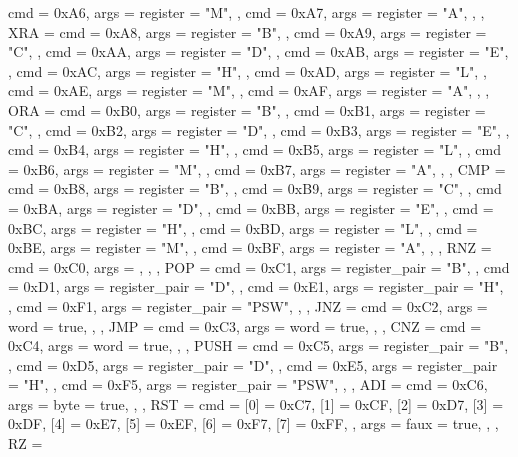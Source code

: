 {{        { cmd = 0xA6, args = {{register = "M"}}, },
        { cmd = 0xA7, args = {{register = "A"}}, },
    },
    XRA  = {
        { cmd = 0xA8, args = {{register = "B"}}, },
        { cmd = 0xA9, args = {{register = "C"}}, },
        { cmd = 0xAA, args = {{register = "D"}}, },
        { cmd = 0xAB, args = {{register = "E"}}, },
        { cmd = 0xAC, args = {{register = "H"}}, },
        { cmd = 0xAD, args = {{register = "L"}}, },
        { cmd = 0xAE, args = {{register = "M"}}, },
        { cmd = 0xAF, args = {{register = "A"}}, },
    },
    ORA  = {
        { cmd = 0xB0, args = {{register = "B"}}, },
        { cmd = 0xB1, args = {{register = "C"}}, },
        { cmd = 0xB2, args = {{register = "D"}}, },
        { cmd = 0xB3, args = {{register = "E"}}, },
        { cmd = 0xB4, args = {{register = "H"}}, },
        { cmd = 0xB5, args = {{register = "L"}}, },
        { cmd = 0xB6, args = {{register = "M"}}, },
        { cmd = 0xB7, args = {{register = "A"}}, },
    },
    CMP  = {
        { cmd = 0xB8, args = {{register = "B"}}, },
        { cmd = 0xB9, args = {{register = "C"}}, },
        { cmd = 0xBA, args = {{register = "D"}}, },
        { cmd = 0xBB, args = {{register = "E"}}, },
        { cmd = 0xBC, args = {{register = "H"}}, },
        { cmd = 0xBD, args = {{register = "L"}}, },
        { cmd = 0xBE, args = {{register = "M"}}, },
        { cmd = 0xBF, args = {{register = "A"}}, },
    },
    RNZ  = {
        { cmd = 0xC0, args = {}, },
    },
    POP  = {
        { cmd = 0xC1, args = {{register_pair = "B"}}, },
        { cmd = 0xD1, args = {{register_pair = "D"}}, },
        { cmd = 0xE1, args = {{register_pair = "H"}}, },
        { cmd = 0xF1, args = {{register_pair = "PSW"}}, },
    },
    JNZ  = {
        { cmd = 0xC2, args = {{word = true}}, },
    },
    JMP  = {
        { cmd = 0xC3, args = {{word = true}}, },
    },
    CNZ  = {
        { cmd = 0xC4, args = {{word = true}}, },
    },
    PUSH = {
        { cmd = 0xC5, args = {{register_pair = "B"}}, },
        { cmd = 0xD5, args = {{register_pair = "D"}}, },
        { cmd = 0xE5, args = {{register_pair = "H"}}, },
        { cmd = 0xF5, args = {{register_pair = "PSW"}}, },
    },
    ADI  = {
        { cmd = 0xC6, args = {{byte = true}}, },
    },
    RST  = {
        {
            cmd = {
                [0] = 0xC7,
                [1] = 0xCF,
                [2] = 0xD7,
                [3] = 0xDF,
                [4] = 0xE7,
                [5] = 0xEF,
                [6] = 0xF7,
                [7] = 0xFF,
            },
            args = {{faux = true}},
        },
    },
    RZ   = {
}}
